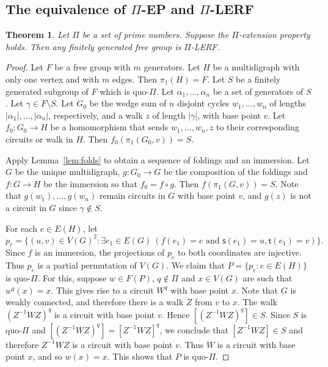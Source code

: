 \documentclass[11pt]{amsart}
\newtheorem{theorem}{Theorem}[section]
\theoremstyle{definition}
\theoremstyle{definition}
\numberwithin{equation}{section}
\begin{document}
\subsection{The equivalence of $\Pi$-EP and $\Pi$-LERF}

\begin{theorem}\label{thm:EPtoLERF} Let $\Pi$ be a set of prime numbers. Suppose the $\Pi$-extension property holds. Then any finitely generated free group is $\Pi$-LERF.
\end{theorem}

\begin{proof} Let $F$ be a free group with $m$ generators. Let $H$ be a multidigraph with only one vertex and with $m$ edges. Then $\pi_1(H)=F$. Let $S$ be a finitely generated subgroup of $F$ which is quo-$\Pi$. Let $\alpha_1,\dots, \alpha_n$ be a set of generators of $S$. Let $\gamma\in F\setminus S$. Let $G_0$ be the wedge sum of $n$ disjoint cycles $w_1, \dots, w_n$ of lengths $|\alpha_1|, \dots, |\alpha_n|$, respectively, and a walk $z$ of length $|\gamma|$, with base point $v$. Let $f_0\colon G_0\to H$ be a homomorphism that sends $w_1,\dots, w_n, z$ to their corresponding circuits or walk in $H$. Then $f_0(\pi_1(G_0,v))=S$. 

Apply Lemma~\ref{lem:folds} to obtain a sequence of foldings and an immersion. Let $G$ be the unique multidigraph, $g\colon G_0\to G$ be the composition of the foldings and $f\colon G\to H$ be the immersion so that $f_0=f\circ g$. Then $f(\pi_1(G, v))=S$. Note that $g(w_1), \dots, g(w_n)$ remain circuits in $G$ with base point $v$, and $g(z)$ is not a circuit in $G$ since $\gamma\not\in S$. 

For each $e\in E(H)$, let
$$ p_e=\{(u,v)\in V(G)^2\colon \exists e_1\in E(G)\ (f(e_1)=e \mbox{ and } \mathsf{s}(e_1)=u, \mathsf{t}(e_1)=v)\}. $$
Since $f$ is an immersion, the projections of $p_e$ to both coordinates are injective. Thus $p_e$ is a partial permutation of $V(G)$. We claim that $P=\{p_e\colon e\in E(H)\}$ is quo-$\Pi$. For this, suppose $w\in F(P)$, $q\not\in \Pi$ and $x\in V(G)$ are such that $w^q(x)=x$. This gives rise to a circuit $W^q$ with base point $x$. Note that $G$ is weakly connected, and therefore there is a walk $Z$ from $v$ to $x$. The walk $(Z^{-1}WZ)^q$ is a circuit with base point $v$. Hence $[(Z^{-1}WZ)^q]\in S$. Since $S$ is quo-$\Pi$ and $[(Z^{-1}WZ)^q]=[Z^{-1}WZ]^q$, we conclude that $[Z^{-1}WZ]\in S$ and therefore $Z^{-1}WZ$ is a circuit with base point $v$. Thus $W$ is a circuit with base point $x$, and so $w(x)=x$. This shows that $P$ is quo-$\Pi$.


\end{proof}
\end{document}
